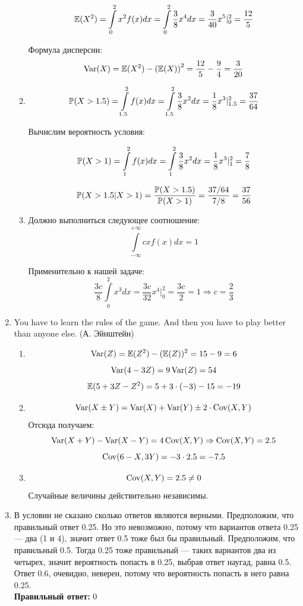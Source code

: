 \documentclass[12pt, a4paper]{article}\usepackage[]{graphicx}\usepackage[]{color}
\begin{document}
\begin{enumerate}
\begin{enumerate}
\[\E(X^2) = \int \limits_0^2 x^2 f(x) dx = \int \limits_0^2 \frac{3}{8} x^4 dx = \frac{3}{40} x^5 |_0^2 = \frac{12}{5}\]

Формула дисперсии:
\[\Var(X) = \E(X^2) - \left(\E(X) \right)^2 = \frac{12}{5} - \frac{9}{4} = \frac{3}{20} \]

\item \[\P(X>1.5) = \int \limits_{1.5}^2 f(x) dx = \int \limits_{1.5}^2 \frac{3}{8} x^2 dx = \frac{1}{8} x^3 |_{1.5}^2 = \frac{37}{64}\]

Вычислим вероятность условия:

\[\P(X>1) = \int \limits_1^2 f(x) dx = \int \limits_1^2 \frac{3}{8} x^2 dx = \frac{1}{8} x^3 |_1^2 = \frac{7}{8}\]

\[\P(X>1.5 | X>1) = \frac{\P(X>1.5)}{\P( X>1)} = \frac{37/64}{7/8} = \frac{37}{56}\]

\item Должно выполниться следующее соотношение:
\[\int \limits_{-\infty}^{+\infty} c x f(x) dx  = 1\]

Применительно к нашей задаче:
\[\frac{3c}{8} \int \limits_0^2 x^3 dx  = \frac{3c}{32} x^4 |_0^2 = \frac{3c}{2} = 1 \Rightarrow c = \frac{2}{3}\]
\end{enumerate}

\item
You have to learn the rules of the game. And then you have to play better than anyone else. (А. Эйнштейн)

\begin{enumerate}
\item \[\Var(Z) = \E(Z^2) - (\E(Z))^2 = 15 - 9 = 6\]
\[\Var(4 - 3Z) = 9\Var(Z) = 54\]
\[\E(5 + 3Z - Z^2) = 5 + 3\cdot (-3)  - 15 = -19 \]

\item \[\Var(X \pm Y) = \Var(X) + \Var(Y) \pm 2 \cdot \Cov(X, Y)\]
Отсюда получаем:
\[\Var(X + Y) - \Var(X - Y) = 4 \Cov(X, Y) \Rightarrow \Cov(X, Y) = 2.5\]
\[\Cov(6 - X, 3Y) = -3\cdot 2.5 = -7.5\]

\item \[\Cov(X, Y) = 2.5 \ne 0\] Случайные величины действительно независимы.
\end{enumerate}


\item
 В условии не сказано сколько ответов являются верными. Предположим, что правильный ответ 0.25. Но это невозможно, потому что вариантов ответа 0.25 — два (1 и 4), значит ответ 0.5 тоже был бы правильный. Предположим, что правильный 0.5. Тогда 0.25 тоже правильный — таких вариантов два из четырех, значит вероятность попасть в 0.25, выбрав ответ наугад, равна 0.5. Ответ 0.6, очевидно, неверен, потому что вероятность попасть в него равна 0.25. \\
\textbf{Правильный ответ:} 0


\end{enumerate}
\end{document}
